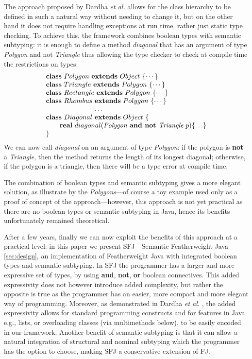 \documentclass[runningheads]{llncs}
\begin{document}
\begin{example}
The approach proposed by Dardha \emph{et al.} \cite{Dardha2013,Dardha2017} allows for the class hierarchy to be defined in such a natural way without needing to change it, but on the other hand it does not require handling exceptions at run time,  rather just static type checking.
To achieve this, the framework combines boolean types with semantic subtyping: it is enough to define a method \emph{diagonal} that has an argument of type \emph{Polygon} and not \emph{Triangle} thus allowing the type checker to check at compile time the restrictions on types:
$$
\begin{array}{l}
\mathbf{class} \  Polygon \ \mathbf{extends }\  Object\ \{\cdots\}
\\
\mathbf{class} \  Triangle \ \mathbf{extends }\  Polygon\ \{\cdots\}
\\
\mathbf{class} \  Rectangle \ \mathbf{extends }\  Polygon\ \{\cdots\}
\\
\mathbf{class} \  Rhombus \ \mathbf{extends }\  Polygon\ \{\cdots\}
\\
\hspace{2.5cm} \ldots
\\
\mathbf{class} \  Diagonal \ \mathbf{extends }\  Object\ \{
	\\
	\qquad \mathbf{real}\ diagonal(\textit{Polygon} \textbf{ and not }  \textit{Triangle} \ p)\{\ldots\}
	\\
\}
\end{array}
$$
We can now call \emph{diagonal} on an argument of type \emph{Polygon}: if the polygon is \textbf{not} a \emph{Triangle}, then the method returns the length of its longest diagonal; otherwise, if the polygon is a triangle, then there will be a type error at compile time.
\end{example}
The combination of boolean types and semantic subtyping gives a more elegant solution, as illustrate by the \emph{Polygons}---of course a toy example used only as a proof of concept of the approach---however, this approach is not yet practical as there are no boolean types or semantic subtyping in Java, hence its benefits unfortunately remained theoretical.

After a few years, finally we can now exploit the benefits of this approach at a practical level: in this paper we present SFJ---Semantic Featherweight Java \autoref{sec:design}, an implementation of Featherweight Java with integrated boolean types and semantic subtyping.
In SFJ the programmer has a larger and more expressive set of types, by using \textbf{and}, \textbf{not}, \textbf{or} boolean connectives. This added expressivity does not however introduce added complexity, but rather the opposite is true as the programmer has an easier, more compact and more elegant way of programming. Moreover, as demonstrated in Dardha \emph{et al.} \cite[\S 8.4]{Dardha2017}, the added expressivity allows for standard programming constructs and for features in Java e.g., lists, or overloading classes (via multimethods below), to be easily encoded in our framework. Another benefit of semantic subtyping is that it can allow a natural integration of structural and nominal subtyping which the programmer has the option to choose, making SFJ a conservative extension of FJ.
\end{document}
